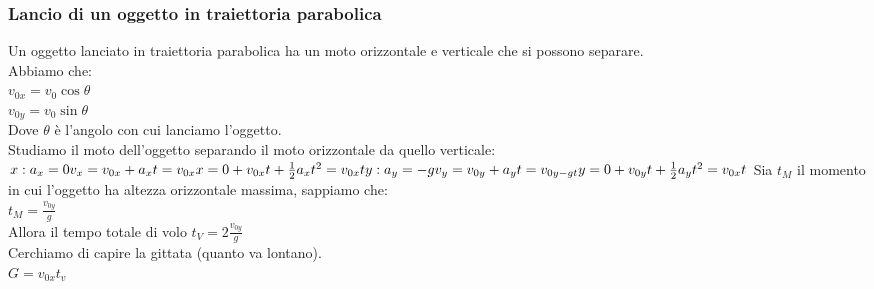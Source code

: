 \documentclass{article}
\begin{document}
\subsubsection*{Lancio di un oggetto in traiettoria parabolica}
Un oggetto lanciato in traiettoria parabolica ha un moto orizzontale e verticale
che si possono separare.\\
Abbiamo che:\\
$v_{0x}=v_0\cos\theta$\\
$v_{0y}=v_0\sin\theta$\\
Dove $\theta$ \`{e} l'angolo con cui lanciamo l'oggetto.\\
Studiamo il moto dell'oggetto separando il moto orizzontale da quello verticale:\\
$x:\\
a_x=0\\
v_x=v_{0x}+a_xt=v_{0x}\\
x=0+v_{0x}t+\frac{1}{2}a_xt^2=v_{0x}t\\
\\
y:\\
a_y=-g\\
v_y=v_{0y}+a_yt=v_{0y-gt}\\
y=0+v_{0y}t+\frac{1}{2}a_yt^2=v_{0x}t$
Sia $t_M$ il momento in cui l'oggetto ha altezza orizzontale massima, sappiamo che:\\
$t_M=\frac{v_{0y}}{g}$\\
Allora il tempo totale di volo $t_V=2\frac{v_{0y}}{g}$\\
Cerchiamo di capire la gittata (quanto va lontano).\\
$G=v_{0x}t_v$
\end{document}
